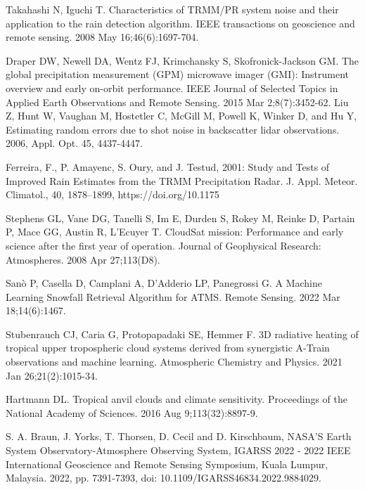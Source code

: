 \documentclass[12pt]{article}
\begin{document}
\begin{thebibliography}{999}

Takahashi N, Iguchi T. Characteristics of TRMM/PR system noise and their application to the rain detection algorithm. 
IEEE transactions on geoscience and remote sensing. 2008 May 16;46(6):1697-704.

Draper DW, Newell DA, Wentz FJ, Krimchansky S, Skofronick-Jackson GM. The global precipitation measurement (GPM) 
microwave imager (GMI): Instrument overview and early on-orbit performance. IEEE Journal of Selected Topics in 
Applied Earth Observations and Remote Sensing. 2015 Mar 2;8(7):3452-62.
Liu Z, Hunt W, Vaughan M, Hostetler C, McGill M, Powell K, Winker D, and  Hu Y, 
Estimating random errors due to shot noise in backscatter lidar observations. 2006, Appl. Opt. 45, 4437-4447.

Ferreira, F., P. Amayenc, S. Oury, and J. Testud, 2001: Study and Tests of Improved Rain Estimates from the TRMM Precipitation Radar. 
J. Appl. Meteor. Climatol., 40, 1878–1899, https://doi.org/10.1175

  Stephens GL, Vane DG, Tanelli S, Im E, Durden S, Rokey M, Reinke D, Partain P, 
  Mace GG, Austin R, L'Ecuyer T. CloudSat mission: Performance and early science 
  after the first year of operation. 
  Journal of Geophysical Research: Atmospheres. 2008 Apr 27;113(D8). 

  Sanò P, Casella D, Camplani A, D’Adderio LP, Panegrossi G. A Machine Learning
  Snowfall Retrieval Algorithm for ATMS. Remote Sensing. 
  2022 Mar 18;14(6):1467.

  Stubenrauch CJ, Caria G, Protopapadaki SE, Hemmer F. 3D radiative heating of 
  tropical upper tropospheric cloud systems derived from synergistic A-Train 
  observations and machine learning. 
  Atmospheric Chemistry and Physics. 2021 Jan 26;21(2):1015-34.

  Hartmann DL. Tropical anvil clouds and climate sensitivity. 
  Proceedings of the National Academy of Sciences. 2016 Aug 9;113(32):8897-9.

  S. A. Braun, J. Yorks, T. Thorsen, D. Cecil and D. Kirschbaum, 
  NASA'S Earth System Observatory-Atmosphere Observing System, 
  IGARSS 2022 - 2022 IEEE International Geoscience and Remote Sensing Symposium, 
  Kuala Lumpur, 
  Malaysia. 2022, pp. 7391-7393, doi: 10.1109/IGARSS46834.2022.9884029.
  

\end{thebibliography}
\end{document}
